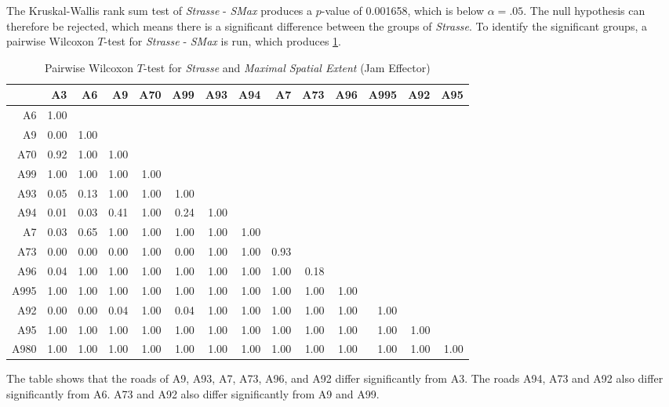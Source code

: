 The Kruskal-Wallis rank sum test of \textit{Strasse} - \textit{SMax} produces a $p$-value of 0.001658, which is below $\alpha=.05$. The null hypothesis can therefore be rejected, which means there is a significant difference between the groups of \textit{Strasse}. To identify the significant groups, a pairwise Wilcoxon $T$-test for \textit{Strasse} - \textit{SMax} is run, which produces \cref{tbl:wilcoxon_baysis_effector_Strasse_SMax}. 
\begin{table}[ht]
	\tiny
	\centering
	\begin{tabular}{rrrrrrrrrrrrrr}
		\toprule
			 & A3 & A6 & A9 & A70 & A99 & A93 & A94 & A7 & A73 & A96 & A995 & A92 & A95 \\ 
		\midrule
		A6   & 1.00 &  &  &  &  &  &  &  &  &  &  &  &  \\ 
		A9   & 0.00 & 1.00 &  &  &  &  &  &  &  &  &  &  &  \\ 
		A70  & 0.92 & 1.00 & 1.00 &  &  &  &  &  &  &  &  &  &  \\ 
		A99  & 1.00 & 1.00 & 1.00 & 1.00 &  &  &  &  &  &  &  &  &  \\ 
		A93  & 0.05 & 0.13 & 1.00 & 1.00 & 1.00 &  &  &  &  &  &  &  &  \\ 
		A94  & 0.01 & 0.03 & 0.41 & 1.00 & 0.24 & 1.00 &  &  &  &  &  &  &  \\ 
		A7   & 0.03 & 0.65 & 1.00 & 1.00 & 1.00 & 1.00 & 1.00 &  &  &  &  &  &  \\ 
		A73  & 0.00 & 0.00 & 0.00 & 1.00 & 0.00 & 1.00 & 1.00 & 0.93 &  &  &  &  &  \\ 
		A96  & 0.04 & 1.00 & 1.00 & 1.00 & 1.00 & 1.00 & 1.00 & 1.00 & 0.18 &  &  &  &  \\ 
		A995 & 1.00 & 1.00 & 1.00 & 1.00 & 1.00 & 1.00 & 1.00 & 1.00 & 1.00 & 1.00 &  &  &  \\ 
		A92  & 0.00 & 0.00 & 0.04 & 1.00 & 0.04 & 1.00 & 1.00 & 1.00 & 1.00 & 1.00 & 1.00 &  &  \\ 
		A95  & 1.00 & 1.00 & 1.00 & 1.00 & 1.00 & 1.00 & 1.00 & 1.00 & 1.00 & 1.00 & 1.00 & 1.00 &  \\ 
		A980 & 1.00 & 1.00 & 1.00 & 1.00 & 1.00 & 1.00 & 1.00 & 1.00 & 1.00 & 1.00 & 1.00 & 1.00 & 1.00 \\ 
		\bottomrule
	  \end{tabular}
    \caption{Pairwise Wilcoxon $T$-test for \textit{Strasse} and \textit{Maximal Spatial Extent} (Jam Effector)}
    \label{tbl:wilcoxon_baysis_effector_Strasse_SMax}
\end{table}
The table shows that the roads of A9, A93, A7, A73, A96, and A92 differ significantly from A3. The roads A94, A73 and A92 also differ significantly from A6. A73 and A92 also differ significantly from A9 and A99.
